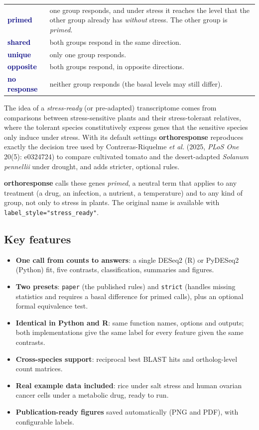 \documentclass[11pt,a4paper]{article}
\newcommand{\code}[1]{\texttt{\color{navy!85!black}#1}}
\newcommand{\pkg}{\textsf{\bfseries orthoresponse}}
\begin{document}
\begin{center}
\begin{tabularx}{0.94\linewidth}{>{\sffamily\bfseries}l Y}
\toprule
\textcolor{navy}{primed} & one group responds, and under stress it reaches the level that the
other group already has \emph{without} stress. The other group is \emph{primed}.\\
\textcolor{navy}{shared} & both groups respond in the same direction.\\
\textcolor{navy}{unique} & only one group responds.\\
\textcolor{navy}{opposite} & both groups respond, in opposite directions.\\
\textcolor{navy}{no response} & neither group responds (the basal levels may still differ).\\
\bottomrule
\end{tabularx}
\end{center}

The idea of a \emph{stress-ready} (or pre-adapted) transcriptome comes from comparisons between
stress-sensitive plants and their stress-tolerant relatives, where the tolerant species
constitutively express genes that the sensitive species only induce under stress. With its default
settings \pkg{} reproduces exactly the decision tree used by Contreras-Riquelme \emph{et al.}
(2025, \emph{PLoS One} 20(5): e0324724) to compare cultivated tomato and the desert-adapted
\emph{Solanum pennellii} under drought, and adds stricter, optional rules.

\pkg{} calls these genes \emph{primed}, a neutral term that applies to any treatment (a drug,
an infection, a nutrient, a temperature) and to any kind of group, not only to stress in plants.
The original name is available with \code{label\_style="stress\_ready"}.

\subsection{Key features}
\begin{itemize}
  \item \textbf{One call from counts to answers}: a single DESeq2 (R) or PyDESeq2 (Python) fit, five
        contrasts, classification, summaries and figures.
  \item \textbf{Two presets}: \code{paper} (the published rules) and \code{strict} (handles missing
        statistics and requires a basal difference for primed calls), plus an optional formal
        equivalence test.
  \item \textbf{Identical in Python and R}: same function names, options and outputs; both
        implementations give the same label for every feature given the same contrasts.
  \item \textbf{Cross-species support}: reciprocal best BLAST hits and ortholog-level count matrices.
  \item \textbf{Real example data included}: rice under salt stress and human ovarian cancer cells
        under a metabolic drug, ready to run.
  \item \textbf{Publication-ready figures} saved automatically (PNG and PDF), with configurable labels.
\end{itemize}
\end{document}
